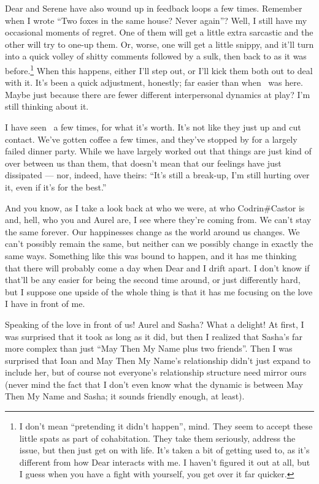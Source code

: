 Dear and Serene have also wound up in feedback loops a few times. Remember when I wrote ``Two foxes in the same house? Never again''? Well, I still have my occasional moments of regret. One of them will get a little extra sarcastic and the other will try to one-up them. Or, worse, one will get a little snippy, and it'll turn into a quick volley of shitty comments followed by a sulk, then back to as it was before.\footnote{I don't mean ``pretending it didn't happen'', mind. They seem to accept these little spats as part of cohabitation. They take them seriously, address the issue, but then just get on with life. It's taken a bit of getting used to, as it's different from how Dear interacts with me. I haven't figured it out at all, but I guess when you have a fight with yourself, you get over it far quicker.} When this happens, either I'll step out, or I'll kick them both out to deal with it. It's been a quick adjustment, honestly; far easier than when \Partner\ was here. Maybe just because there are fewer different interpersonal dynamics at play? I'm still thinking about it.

I have seen \Partner\ a few times, for what it's worth. It's not like they just up and cut contact. We've gotten coffee a few times, and they've stopped by for a largely failed dinner party. While we have largely worked out that things are just kind of over between us than them, that doesn't mean that our feelings have just dissipated — nor, indeed, have theirs: ``It's still a break-up, I'm still hurting over it, even if it's for the best.''

And you know, as I take a look back at who we were, at who Codrin\#Castor is and, hell, who you and Aurel are, I see where they're coming from. We can't stay the same forever. Our happinesses change as the world around us changes. We can't possibly remain the same, but neither can we possibly change in exactly the same ways. Something like this was bound to happen, and it has me thinking that there will probably come a day when Dear and I drift apart. I don't know if that'll be any easier for being the second time around, or just differently hard, but I suppose one upside of the whole thing is that it has me focusing on the love I have in front of me.

Speaking of the love in front of us! Aurel and Sasha? What a delight! At first, I was surprised that it took as long as it did, but then I realized that Sasha's far more complex than just ``May Then My Name plus two friends''. Then I was surprised that Ioan and May Then My Name's relationship didn't just expand to include her, but of course not everyone's relationship structure need mirror ours (never mind the fact that I don't even know what the dynamic is between May Then My Name and Sasha; it sounds friendly enough, at least).


